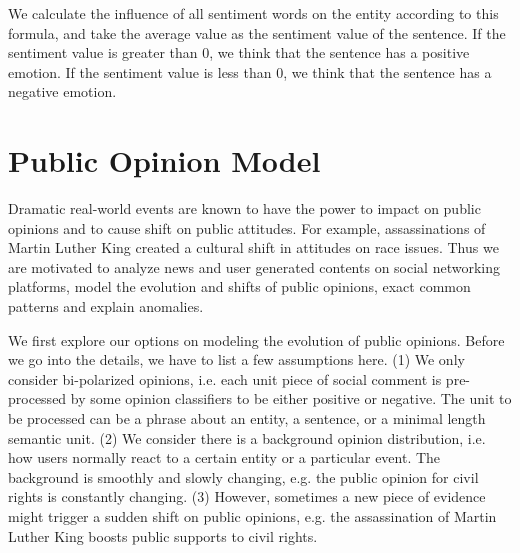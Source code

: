 \documentclass[runningheads]{llncs}
\begin{document}
We calculate the influence of all sentiment words on the entity according to this formula, and take the average value as the sentiment value of the sentence. If the sentiment value is greater than 0, we think that the sentence has a positive emotion. If the sentiment value is less than 0, we think that the sentence has a negative emotion.
\section{Public Opinion Model}\label{sec:public opinion model}
Dramatic real-world events are known to have the power to impact on public opinions and to cause shift on public attitudes. For example, assassinations of Martin Luther King created a cultural shift in attitudes on race issues. Thus we are motivated to analyze news and user generated contents on social networking platforms, model the evolution and shifts of public opinions,  exact common patterns and explain anomalies.

We first explore our options on modeling the evolution of public opinions. Before we go into the details, we have to list a few assumptions here. (1) We only consider bi-polarized opinions, i.e. each unit piece of social comment is pre-processed by some opinion classifiers to be either positive or negative. The unit to be processed can be a phrase about an entity, a sentence, or a minimal length semantic unit. (2) We consider there is a background opinion distribution, i.e. how users normally react to a certain entity or a particular event. The background is smoothly and slowly changing, e.g. the public opinion for civil rights is constantly changing. (3) However, sometimes a new piece of evidence might trigger a sudden shift on public opinions, e.g. the assassination of Martin Luther King boosts public  supports to civil rights.  
\end{document}
